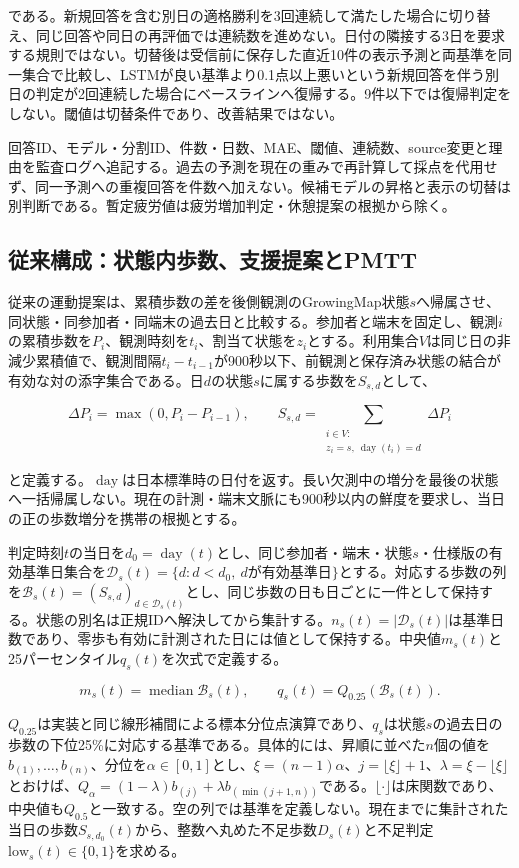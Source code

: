 である。新規回答を含む別日の適格勝利を3回連続して満たした場合に切り替え、同じ回答や同日の再評価では連続数を進めない。日付の隣接する3日を要求する規則ではない。切替後は受信前に保存した直近10件の表示予測と両基準を同一集合で比較し、LSTMが良い基準より0.1点以上悪いという新規回答を伴う別日の判定が2回連続した場合にベースラインへ復帰する。9件以下では復帰判定をしない。閾値は切替条件であり、改善結果ではない。

回答ID、モデル・分割ID、件数・日数、MAE、閾値、連続数、source変更と理由を監査ログへ追記する。過去の予測を現在の重みで再計算して採点を代用せず、同一予測への重複回答を件数へ加えない。候補モデルの昇格と表示の切替は別判断である。暫定疲労値は疲労増加判定・休憩提案の根拠から除く。

\subsection{従来構成：状態内歩数、支援提案とPMTT}

従来の運動提案は、累積歩数の差を後側観測のGrowingMap状態\(s\)へ帰属させ、同状態・同参加者・同端末の過去日と比較する。参加者と端末を固定し、観測\(i\)の累積歩数を\(P_i\)、観測時刻を\(t_i\)、割当て状態を\(z_i\)とする。利用集合\(V\)は同じ日の非減少累積値で、観測間隔\(t_i-t_{i-1}\)が900秒以下、前観測と保存済み状態の結合が有効な対の添字集合である。日\(d\)の状態\(s\)に属する歩数を\(S_{s,d}\)として、

\[
\Delta P_i=\max(0,P_i-P_{i-1}),\qquad
S_{s,d}=\sum_{\substack{i\in V:\\z_i=s,\ \operatorname{day}(t_i)=d}}
\Delta P_i
\]

と定義する。\(\operatorname{day}\)は日本標準時の日付を返す。長い欠測中の増分を最後の状態へ一括帰属しない。現在の計測・端末文脈にも900秒以内の鮮度を要求し、当日の正の歩数増分を携帯の根拠とする。

判定時刻\(t\)の当日を\(d_0=\operatorname{day}(t)\)とし、同じ参加者・端末・状態\(s\)・仕様版の有効基準日集合を\(\mathcal D_s(t)=\{d:d<d_0,\ d\text{が有効基準日}\}\)とする。対応する歩数の列を\(\mathcal B_s(t)=(S_{s,d})_{d\in\mathcal D_s(t)}\)とし、同じ歩数の日も日ごとに一件として保持する。状態の別名は正規IDへ解決してから集計する。\(n_s(t)=|\mathcal D_s(t)|\)は基準日数であり、零歩も有効に計測された日には値として保持する。中央値\(m_s(t)\)と25パーセンタイル\(q_s(t)\)を次式で定義する。

\[
m_s(t)=\operatorname{median}\mathcal B_s(t),\qquad
q_s(t)=Q_{0.25}(\mathcal B_s(t)).
\]

\(Q_{0.25}\)は実装と同じ線形補間による標本分位点演算であり、\(q_s\)は状態\(s\)の過去日の歩数の下位25\%に対応する基準である。具体的には、昇順に並べた\(n\)個の値を\(b_{(1)},\ldots,b_{(n)}\)、分位を\(\alpha\in[0,1]\)とし、\(\xi=(n-1)\alpha\)、\(j=\lfloor\xi\rfloor+1\)、\(\lambda=\xi-\lfloor\xi\rfloor\)とおけば、\(Q_\alpha=(1-\lambda)b_{(j)}+\lambda b_{(\min(j+1,n))}\)である。\(\lfloor\cdot\rfloor\)は床関数であり、中央値も\(Q_{0.5}\)と一致する。空の列では基準を定義しない。現在までに集計された当日の歩数\(S_{s,d_0}(t)\)から、整数へ丸めた不足歩数\(D_s(t)\)と不足判定\(\mathrm{low}_s(t)\in\{0,1\}\)を求める。

